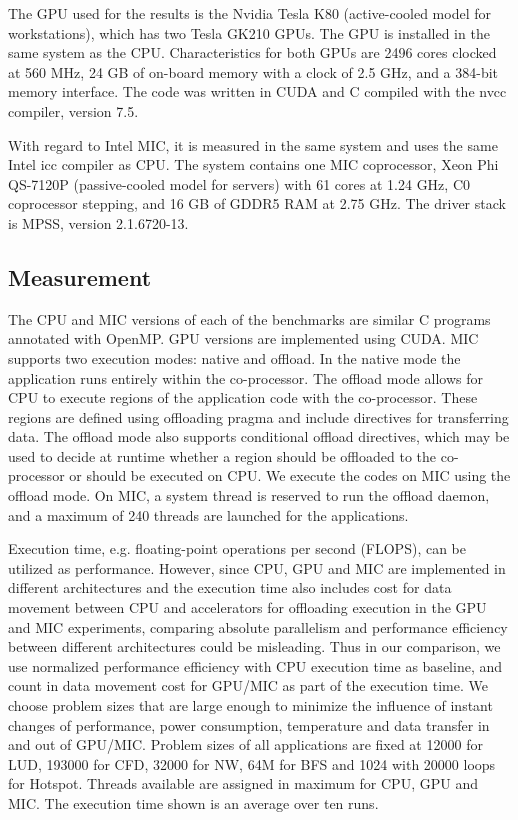 
The GPU used for the results is the Nvidia Tesla K80 (active-cooled model for workstations), which has two Tesla GK210 GPUs. The GPU 
is installed in the same system as the CPU. 
Characteristics for both GPUs are 2496 cores clocked at 560 MHz, 24 GB of on-board memory with a clock of 2.5 GHz, and a 384-bit memory interface. The code was written in CUDA and C compiled with the nvcc compiler, version 7.5. 


With regard to Intel MIC, it is measured in the same system and uses the same Intel icc compiler as CPU. 
The system contains one MIC coprocessor, Xeon Phi QS-7120P (passive-cooled model for servers) with 61 cores at 1.24 GHz, C0 coprocessor stepping, and 16 GB of GDDR5 RAM at 2.75 GHz. The driver stack is MPSS, version 2.1.6720-13. 

\subsection{Measurement}

The CPU and MIC versions of each of the benchmarks are similar C programs annotated with OpenMP. 
GPU versions are implemented using CUDA. MIC supports two execution modes: native and offload. 
In the native mode the application runs entirely within the co-processor. The offload mode allows for CPU to 
execute regions of the application code with the co-processor. These regions are defined using offloading pragma 
and include directives for transferring data. The offload mode also supports conditional offload directives, 
which may be used to decide at runtime whether a region should be offloaded to the co-processor or 
should be executed on CPU. We execute the codes on MIC using the offload mode. On MIC, a system thread 
is reserved to run the offload daemon, and a maximum of 240 threads are launched for the applications.

Execution time, e.g. floating-point operations per second (FLOPS), can be utilized as performance. 
However, since CPU, GPU and MIC are implemented in 
different architectures and the execution time also includes cost for data movement between CPU and accelerators 
for offloading execution in the GPU and MIC experiments, comparing absolute parallelism and performance efficiency between 
different architectures could be misleading. Thus in our comparison, we use normalized performance efficiency with CPU 
execution time as baseline, and count in data movement cost for GPU/MIC as part of the execution time. 
We choose problem sizes that are large enough to 
minimize the influence of instant changes of performance, power consumption, 
temperature and data transfer in and out of GPU/MIC. 
Problem sizes of all applications are fixed at 12000 for LUD, 193000 for CFD, 32000 for NW, 64M for BFS and 1024 with 20000 loops for Hotspot. Threads available are assigned in maximum for CPU, GPU and MIC. The execution time shown is an average over ten runs.

